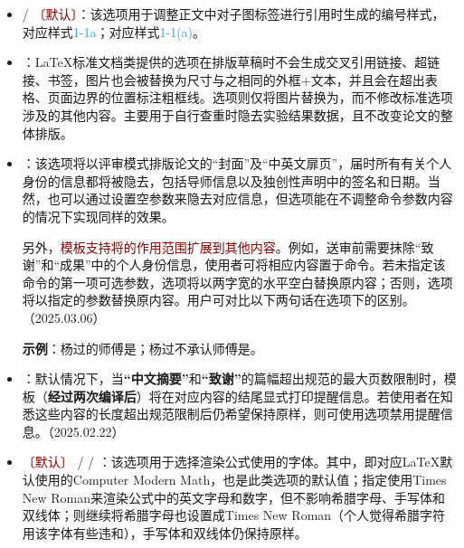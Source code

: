 \documentclass[doctor, vlined, ]{DissertUESTC}
\begin{document}
\begin{itemize}
\begin{itemize}
			\item {} / \textcolor{DarkRed}{〔默认〕}：该选项用于调整正文中对子图标签进行引用时生成的编号样式，对应样式\textcolor{DodgerBlue}{1-1a}；对应样式\textcolor{DodgerBlue}{1-1(a)}。
   
			\item {}：LaTeX标准文档类提供的选项在排版草稿时不会生成交叉引用链接、超链接、书签，图片也会被替换为尺寸与之相同的外框+文本，并且会在超出表格、页面边界的位置标注粗框线。选项则仅将图片替换为，而不修改标准选项涉及的其他内容。主要用于自行查重时隐去实验结果数据，且不改变论文的整体排版。
			
			\item {}：该选项将以评审模式排版论文的“封面”及“中英文扉页”，届时所有有关个人身份的信息都将被隐去，包括导师信息以及独创性声明中的签名和日期。当然，也可以通过设置空参数来隐去对应信息，但选项能在不调整命令参数内容的情况下实现同样的效果。
			
			另外，\textcolor{DarkRed}{模板支持将的作用范围扩展到其他内容}。例如，送审前需要抹除“致谢”和“成果”中的个人身份信息，使用者可将相应内容置于命令。若未指定该命令的第一项可选参数，选项将以两字宽的水平空白替换原内容；否则，选项将以指定的参数替换原内容。用户可对比以下两句话在选项下的区别。（2025.03.06）

			\textbf{示例}：杨过的师傅是；杨过不承认师傅是。
			
			\item {}：默认情况下，当\textbf{“中文摘要”}和\textbf{“致谢”}的篇幅超出规范的最大页数限制时，模板（\textbf{经过两次编译后}）将在对应内容的结尾显式打印提醒信息。若使用者在知悉这些内容的长度超出规范限制后仍希望保持原样，则可使用选项禁用提醒信息。（2025.02.22）
			
			\item {}\textcolor{DarkRed}{〔默认〕} /  / ：该选项用于选择渲染公式使用的字体。其中，即对应LaTeX默认使用的Computer Modern Math，也是此类选项的默认值；指定使用Times New Roman来渲染公式中的英文字母和数字，但不影响希腊字母、手写体和双线体；则继续将希腊字母也设置成Times New Roman（个人觉得希腊字符用该字体有些违和），手写体和双线体仍保持原样。
			

\end{itemize}
\end{itemize}
\end{document}
